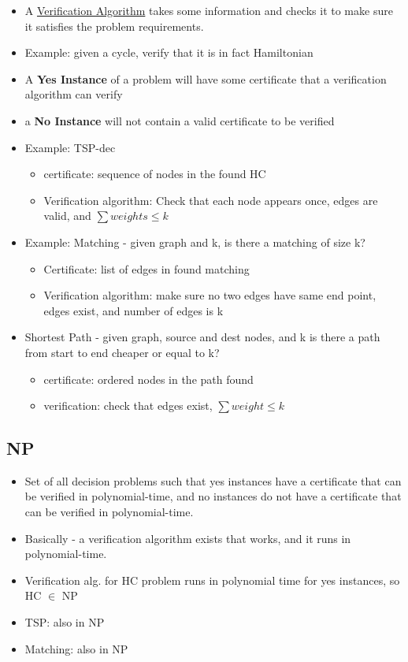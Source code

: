 \documentclass[12pt, letter]{article}
\begin{document}
\begin{itemize}
	\item A \underline{Verification Algorithm} takes some information and checks it to make sure it satisfies the problem requirements.
	\item Example: given a cycle, verify that it is in fact Hamiltonian
	\item A \textbf{Yes Instance} of a problem will have some certificate that a verification algorithm can verify
	\item a  \textbf{No Instance} will not contain a valid certificate to be verified
	\item Example: TSP-dec
	\begin{itemize}
		\item certificate: sequence of nodes in the found HC
		\item Verification algorithm: Check that each node appears once, edges are valid, and $\sum weights \le k$
	\end{itemize}
	\item Example: Matching - given graph and k, is there a matching of size k?
	\begin{itemize}
		\item Certificate: list of edges in found matching
		\item Verification algorithm: make sure no two edges have same end point, edges exist, and number of edges is k
	\end{itemize}
	\item Shortest Path - given graph, source and dest nodes, and k is there a path from start to end cheaper or equal to k?
	\begin{itemize}
		\item certificate: ordered nodes in the path found
		\item verification: check that edges exist, $\sum weight \le k$
	\end{itemize}
\end{itemize}

\subsection*{NP}
\begin{itemize}
	\item Set of all decision problems such that yes instances have a certificate that can be verified in polynomial-time, and no instances do not have a certificate that can be verified in polynomial-time.
	\item Basically - a verification algorithm exists that works, and it runs in polynomial-time.
	\item Verification alg. for HC problem runs in polynomial time for yes instances, so HC $\in$ NP
	\item TSP: also in NP
	\item Matching: also in NP
\end{itemize}
\end{document}
